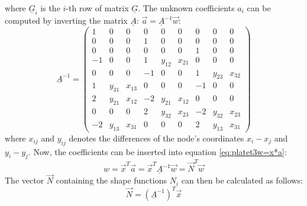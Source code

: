   where $\underline{G}_i$ is the $i$-th row of matrix $\underline{G}$.
  The unknown coefficients $a_i$ can be computed by inverting the matrix $\underline{A}$: $\vec{a} = \underline{A}^{-1} \vec{w}$:
  \begin{equation}
  \underline{A}^{-1} = \begin{pmatrix}
  1& 0& 0& 0& 0& 0& 0& 0& 0\\
  0& 0& 0& 1& 0& 0& 0& 0& 0\\
  0& 0& 0& 0& 0& 0& 1& 0& 0\\
  -1& 0& 0& 1& y_{12}& x_{21}& 0& 0& 0\\
  0& 0& 0& -1& 0& 0& 1& y_{23}& x_{32}\\
  1& y_{31}& x_{13}& 0& 0& 0& -1& 0& 0\\
  2& y_{21}& x_{12}& -2& y_{21}& x_{12}& 0& 0& 0\\
  0& 0& 0& 2& y_{32}& x_{23}& -2& y_{32}& x_{23}\\
  -2& y_{13}& x_{31}& 0& 0& 0& 2& y_{13}& x_{31}
  \end{pmatrix}
  \end{equation}
  where $x_{ij}$ and $y_{ij}$ denotes the differences of the node's coordinates $x_i-x_j$ and $y_i-y_j$.
  Now, the coefficients can be inserted into equation \eqref{eq:platet3w=x*a}:
  \begin{equation}\label{eq:w=NT*vecw}
  w = \vec{x}^T \vec{a} = \vec{x}^T \underline{A}^{-1} \vec{w} = \vec{N}^T \vec{w}
  \end{equation}
  The vector $\vec{N}$ containing the shape functions $N_i$ can then be calculated as follows:
  \begin{equation}
  \vec{N} = \left(\underline{A}^{-1}\right)^T \vec{x}
  \end{equation}
  
